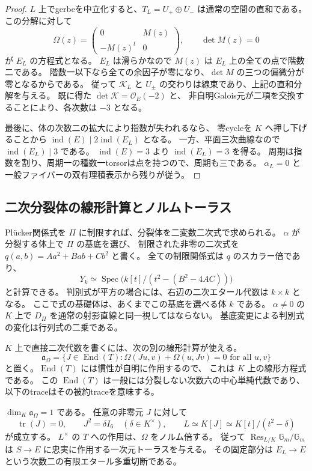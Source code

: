 \begin{proof}
$L$ 上でgerbeを中立化すると、$T_L=U_+\oplus U_-$ は通常の空間の直和である。
この分解に対して
\[
 \Omega(z)=\begin{pmatrix}0&M(z)\\-M(z)^t&0\end{pmatrix},
 \qquad \det M(z)=0
\]
が $E_L$ の方程式となる。
$E_L$ は滑らかなので $M(z)$ は $E_L$ 上の全ての点で階数二である。
階数一以下なら全ての余因子が零になり、$\det M$ の三つの偏微分が零となるからである。
従って $\mathcal K_L$ と $U_\pm$ の交わりは線束であり、上記の直和分解を与える。
既に得た $\det\mathcal K=\mathcal O_E(-2)$ と、
非自明Galois元が二項を交換することにより、各次数は $-3$ となる。

最後に、体の次数二の拡大により指数が失われるなら、
零cycleを $K$ へ押し下げることから
$\operatorname{ind}(E)\mid2\operatorname{ind}(E_L)$ となる。
一方、平面三次曲線なので $\operatorname{ind}(E_L)\mid3$ である。
$\operatorname{ind}(E)=3$ より $\operatorname{ind}(E_L)=3$ を得る。
周期は指数を割り、周期一の種数一torsorは点を持つので、周期も三である。
$\alpha_L=0$ と一般ファイバーの双有理積表示から残りが従う。
\end{proof}

\subsection{二次分裂体の線形計算とノルムトーラス}

Pl\"ucker関係式を $\Pi$ に制限すれば、分裂体を二変数二次式で求められる。
$\alpha$ が分裂する体上で $\Pi$ の基底を選び、
制限された非零の二次式を $q(a,b)=Aa^2+Bab+Cb^2$ と書く。
全ての制限関係式は $q$ のスカラー倍であり、
\[
 Y_k\simeq\operatorname{Spec}\bigl(k[t]/(t^2-(B^2-4AC))\bigr)
\]
と計算できる。
判別式が平方の場合には、右辺の二次エタール代数は $k\times k$ となる。
ここで式の基礎体は、あくまでこの基底を選べる体 $k$ である。
$\alpha\ne0$ の $K$ 上で $D_\Pi$ を通常の射影直線と同一視してはならない。
基底変更による判別式の変化は行列式の二乗である。

$K$ 上で直接二次代数を書くには、次の別の線形計算が使える。
\[
 \mathfrak a_\Omega=
 \{J\in\operatorname{End}(T):
       \Omega(Ju,v)+\Omega(u,Jv)=0\text{ for all }u,v\}
\]
と置く。$\operatorname{End}(T)$ には慣性が自明に作用するので、
これは $K$ 上の線形方程式である。
この $\operatorname{End}(T)$ は一般には分裂しない次数六の中心単純代数であり、
以下のtraceはその被約traceを意味する。

\begin{proposition}[内在的な二次代数とトーラス]
\label{prop:quadratic-lie-algebra-v28}
$\dim_K\mathfrak a_\Omega=1$ である。
任意の非零元 $J$ に対して
\[
 \operatorname{tr}(J)=0,\qquad J^2=\delta I_6\quad(\delta\in K^\times),
 \qquad L\simeq K[J]\simeq K[t]/(t^2-\delta)
\]
が成立する。
$L^\times$ の $T$ への作用は、$\Omega$ をノルム倍する。
従って $\operatorname{Res}_{L/K}\mathbb G_m/\mathbb G_m$ は
$S\to E$ に忠実に作用する一次元トーラスを与える。
その固定部分は $E_L\to E$ という次数二の有限エタール多重切断である。
\end{proposition}

